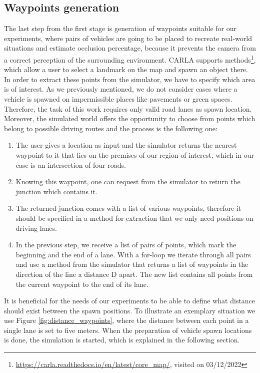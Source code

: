 \subsection{Waypoints generation}
The last step from the first stage is generation of waypoints suitable for our experiments, where pairs of vehicles are going to be placed to recreate real-world situations and estimate occlusion percentage, because it prevents the camera from a correct perception of the surrounding environment. CARLA supports methods\footnote{\url{https://carla.readthedocs.io/en/latest/core_map/}, visited on 03/12/2022}, which allow a user to select a landmark on the map and spawn an object there. In order to extract these points from the simulator, we have to specify which area is of interest. As we previously mentioned, we do not consider cases where a vehicle is spawned on impermissible places like pavements or green spaces. Therefore, the task of this work requires only valid road lanes as spawn location. Moreover, the simulated world offers the opportunity to choose from points which belong to possible driving routes and the process is the following one:
\begin{enumerate}
    \item The user gives a location as input and the simulator returns the nearest waypoint to it that lies on the premises of our region of interest, which in our case is an intersection of four roads.
    \item Knowing this waypoint, one can request from the simulator to return the junction which contains it.
    \item The returned junction comes with a list of various waypoints, therefore it should be specified in a method for extraction that we only need positions on driving lanes.
    \item In the previous step, we receive a list of pairs of points, which mark the beginning and the end of a lane. With a for-loop we iterate through all pairs and use a method from the simulator that returns a list of waypoints in the direction of the line a distance D apart. The new list contains all points from the current waypoint to the end of its lane.
\end{enumerate}
It is beneficial for the needs of our experiments to be able to define what distance should exist between the spawn positions. To illustrate an exemplary situation we use Figure \ref{fig:distance_waypoints}, where the distance between each point in a single lane is set to five meters. When the preparation of vehicle spawn locations is done, the simulation is started, which is explained in the following section.


